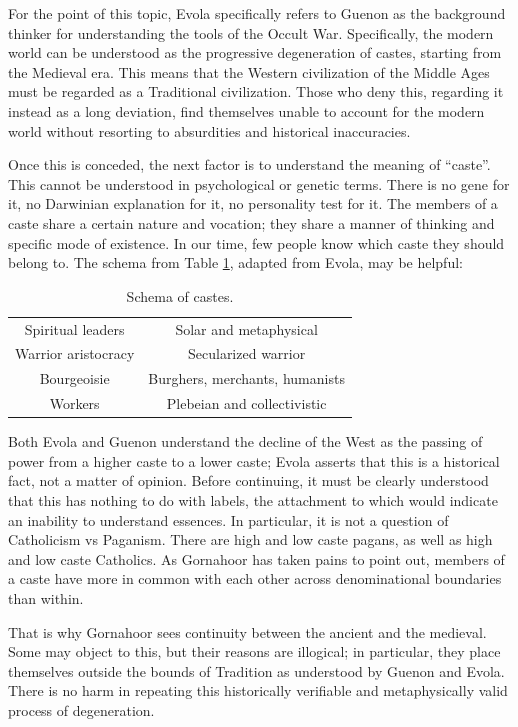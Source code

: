 For the point of this topic, Evola specifically refers to Guenon as the background thinker for understanding the tools of the Occult War. Specifically, the modern world can be understood as the progressive degeneration of castes, starting from the Medieval era. This means that the Western civilization of the Middle Ages must be regarded as a Traditional civilization. Those who deny this, regarding it instead as a long deviation, find themselves unable to account for the modern world without resorting to absurdities and historical inaccuracies.

Once this is conceded, the next factor is to understand the meaning of ``caste''. This cannot be understood in psychological or genetic terms. There is no gene for it, no Darwinian explanation for it, no personality test for it. The members of a caste share a certain nature and vocation; they share a manner of thinking and specific mode of existence. In our time, few people know which caste they should belong to. The schema from Table \ref{tab:SchemaCastes}, adapted from Evola, may be helpful:

\begin{table}[h]\small\centering
\begin{tabular}{cc}\toprule
Spiritual leaders & Solar and metaphysical \\
Warrior aristocracy & Secularized warrior \\
Bourgeoisie & Burghers, merchants, humanists \\ 
Workers & Plebeian and collectivistic \\\bottomrule
\end{tabular}
\caption{Schema of castes.}
\label{tab:SchemaCastes}
\end{table}

Both Evola and Guenon understand the decline of the West as the passing of power from a higher caste to a lower caste; Evola asserts that this is a historical fact, not a matter of opinion. Before continuing, it must be clearly understood that this has nothing to do with labels, the attachment to which would indicate an inability to understand essences. In particular, it is not a question of Catholicism vs Paganism. There are high and low caste pagans, as well as high and low caste Catholics. As Gornahoor has taken pains to point out, members of a caste have more in common with each other across denominational boundaries than within.

That is why Gornahoor sees continuity between the ancient and the medieval. Some may object to this, but their reasons are illogical; in particular, they place themselves outside the bounds of Tradition as understood by Guenon and Evola. There is no harm in repeating this historically verifiable and metaphysically valid process of degeneration.

